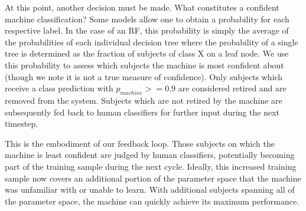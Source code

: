\documentclass[twocolumn]{aastex6}
\begin{document}
At this point, another decision must be made. What constitutes a confident machine
classification? Some models allow one to obtain a probability for each respective label. 
In the case of an RF, this probability is simply the average of the probabilities of each 
individual decision tree where the probability of a single tree is determined as the fraction
of subjects of class X on a leaf node.  We use this probability to assess which subjects
the machine is most confident about (though we note it is not a true measure of confidence).
Only subjects which receive a class prediction with $p_{machine} >= 0.9$ are considered
retired and are removed from the system. Subjects which are not retired by the machine 
are subsequently fed back to human classifiers for further input during the next timestep.  

This is the embodiment of our feedback loop. Those subjects on which the machine
is least confident are judged by human classifiers, potentially becoming part of the
training sample during the next cycle. Ideally, this increased training sample now 
covers an additional portion of the parameter space that the machine was unfamiliar
with or unable to learn. With additional subjects spanning all of the parameter space, 
the machine can quickly achieve its maximum performance. 

\end{document}
